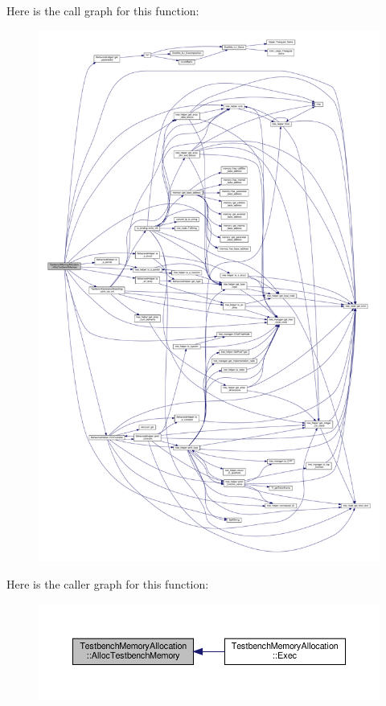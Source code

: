 Here is the call graph for this function\+:
\nopagebreak
\begin{figure}[H]
\begin{center}
\leavevmode
\includegraphics[width=350pt]{dc/d25/classTestbenchMemoryAllocation_a3575bb53a3cd98bce82a358a8e506aca_cgraph}
\end{center}
\end{figure}
Here is the caller graph for this function\+:
\nopagebreak
\begin{figure}[H]
\begin{center}
\leavevmode
\includegraphics[width=350pt]{dc/d25/classTestbenchMemoryAllocation_a3575bb53a3cd98bce82a358a8e506aca_icgraph}
\end{center}
\end{figure}
\mbox{\label{classTestbenchMemoryAllocation_af4e4b578f2465b7694e8e847e8ccfd6d}} 
